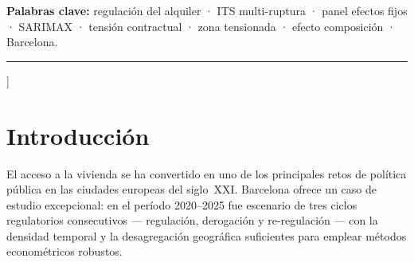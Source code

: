 \documentclass[10pt,a4paper,twocolumn]{article}
\begin{document}
{\begin{@twocolumnfalse}
\vspace{4pt}
\noindent\textbf{Palabras clave:} regulación del alquiler · ITS multi-ruptura · panel efectos fijos · SARIMAX · tensión contractual · zona tensionada · efecto composición · Barcelona.

\vspace{8pt}

\begin{otherlanguage}{english}
\begin{abstract}
\noindent
We present a quantitative study of Barcelona's residential rental market over the
period 2000--2025 (103 quarters), covering three successive regulatory cycles: Law
11/2020, a Constitutional Court ruling (2022), and Law 12/2023. Four complementary
methods are applied to official quarterly data for 10 districts and 66 neighbourhoods:
\textit{(i)}~fixed-effects panel regression (\textit{within} estimator, $N{=}2{,}838$);
\textit{(ii)}~supervised classification of contractual tension episodes; \textit{(iii)}~SARIMAX$(1,1,1)(1,0,1)_4$ models with multi-break interrupted time series (ITS-3)
analysis across 30 district$\times$metric combinations; and \textit{(iv)}~the same
models on the city-aggregate series for three metrics: nominal price, real price (2025
base), and contract volume. The ITS-3 shows that Law 12/2023 causes a structural drop
in contracts ($\hat{\beta}{=}{-}1{,}588$, $p{=}0.007$) and a paradoxical real-price
increase ($+0.495$\,\euro/m$^2$, $p{=}0.034$), consistent with a composition effect.
The SARIMAX achieves 3.3\,\% MAPE on the city-level nominal price.\\[2pt]
\textbf{Keywords:} rent control · interrupted time series · fixed-effects panel · SARIMAX · contractual tension · Barcelona.
\end{abstract}
\end{otherlanguage}

\vspace{10pt}
\hrule
\vspace{8pt}
\end{@twocolumnfalse}
}]

\section{Introducción}
\label{sec:intro}

El acceso a la vivienda se ha convertido en uno de los principales retos de política
pública en las ciudades europeas del siglo~XXI. Barcelona ofrece un caso de estudio
excepcional: en el período 2020--2025 fue escenario de tres ciclos regulatorios
consecutivos --- regulación, derogación y re-regulación --- con la densidad temporal
y la desagregación geográfica suficientes para emplear métodos econométricos robustos.
\end{document}
